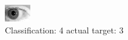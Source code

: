 \begin{figure}[h!]
\begin{center}
\includegraphics[width=0.60\columnwidth]{figures/ID263_class_4_target_3.png}
\end{center}
\caption{ Classification: 4 actual target: 3}
\label{fig:ID263_class_4_target_3}
\end{figure}
